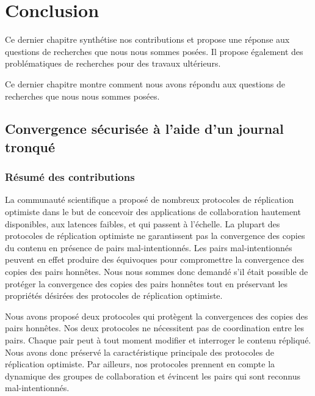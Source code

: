 
\chapter{Conclusion}\label{ch:conclusion}

\minitoc{}
\bigskip

Ce dernier chapitre synthétise nos contributions et propose une réponse aux questions de recherches que nous nous sommes posées.
Il propose également des problématiques de recherches pour des travaux ultérieurs.

Ce dernier chapitre montre comment nous avons répondu aux questions de recherches que nous nous sommes posées.

\clearpage


\section{Convergence sécurisée à l'aide d'un journal tronqué}

\subsection{Résumé des contributions}

La communauté scientifique a proposé de nombreux protocoles de réplication optimiste dans le but de concevoir des applications de collaboration hautement disponibles, aux latences faibles, et qui passent à l'échelle.
La plupart des protocoles de réplication optimiste ne garantissent pas la convergence des copies du contenu en présence de pairs mal-intentionnés.
Les pairs mal-intentionnés peuvent en effet produire des équivoques pour compromettre la convergence des copies des pairs honnêtes.
Nous nous sommes donc demandé s'il était possible de protéger la convergence des copies des pairs honnêtes tout en préservant les propriétés désirées des protocoles de réplication optimiste.

Nous avons proposé deux protocoles qui protègent la convergences des copies des pairs honnêtes.
Nos deux protocoles ne nécessitent pas de coordination entre les pairs.
Chaque pair peut à tout moment modifier et interroger le contenu répliqué.
Nous avons donc préservé la caractéristique principale des protocoles de réplication optimiste.
Par ailleurs, nos protocoles prennent en compte la dynamique des groupes de collaboration et évincent les pairs qui sont reconnus mal-intentionnés.

